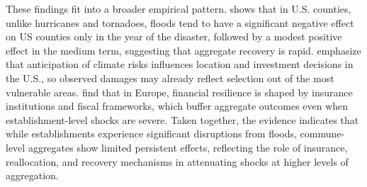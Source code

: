 These findings fit into a broader empirical pattern. \cite{roth2020local} shows that in U.S. counties, unlike hurricanes and tornadoes, floods tend to have a significant negative effect on US counties only in the year of the disaster, followed by a modest positive effect in the medium term, suggesting that aggregate recovery is rapid. \cite{bilal2023anticipating} emphasize that anticipation of climate risks influences location and investment decisions in the U.S., so observed damages may already reflect selection out of the most vulnerable areas. \cite{fatica2024floods} find that in Europe, financial resilience is shaped by insurance institutions and fiscal frameworks, which buffer aggregate outcomes even when establishment-level shocks are severe. Taken together, the evidence indicates that while establishments experience significant disruptions from floods, commune-level aggregates show limited persistent effects, reflecting the role of insurance, reallocation, and recovery mechanisms in attenuating shocks at higher levels of aggregation.






